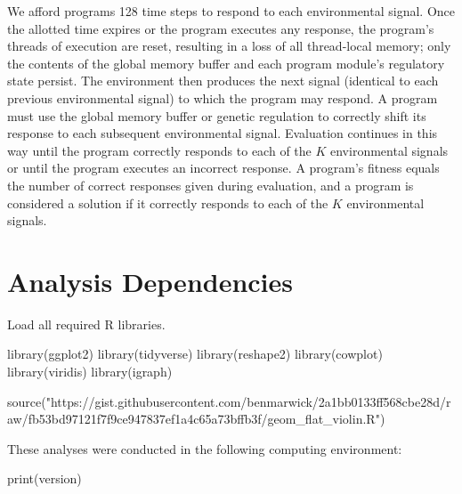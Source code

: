 \documentclass[
]{book}
\newenvironment{Shaded}{\begin{snugshade}}{\end{snugshade}}
\newcommand{\FunctionTok}[1]{\textcolor[rgb]{0.00,0.00,0.00}{#1}}
\newcommand{\NormalTok}[1]{#1}
\newcommand{\StringTok}[1]{\textcolor[rgb]{0.31,0.60,0.02}{#1}}
\begin{document}
We afford programs 128 time steps to respond to each environmental signal.
Once the allotted time expires or the program executes any response, the program's threads of execution are reset, resulting in a loss of all thread-local memory; only the contents of the global memory buffer and each program module's regulatory state persist.
The environment then produces the next signal (identical to each previous environmental signal) to which the program may respond.
A program must use the global memory buffer or genetic regulation to correctly shift its response to each subsequent environmental signal.
Evaluation continues in this way until the program correctly responds to each of the \(K\) environmental signals or until the program executes an incorrect response.
A program's fitness equals the number of correct responses given during evaluation, and a program is considered a solution if it correctly responds to each of the \(K\) environmental signals.

\hypertarget{analysis-dependencies-1}{%
\section{Analysis Dependencies}\label{analysis-dependencies-1}}

Load all required R libraries.

\begin{Shaded}
\begin{Highlighting}[]
\FunctionTok{library}\NormalTok{(ggplot2)}
\FunctionTok{library}\NormalTok{(tidyverse)}
\FunctionTok{library}\NormalTok{(reshape2)}
\FunctionTok{library}\NormalTok{(cowplot)}
\FunctionTok{library}\NormalTok{(viridis)}
\FunctionTok{library}\NormalTok{(igraph)}

\FunctionTok{source}\NormalTok{(}\StringTok{"https://gist.githubusercontent.com/benmarwick/2a1bb0133ff568cbe28d/raw/fb53bd97121f7f9ce947837ef1a4c65a73bffb3f/geom\_flat\_violin.R"}\NormalTok{)}
\end{Highlighting}
\end{Shaded}

These analyses were conducted in the following computing environment:

\begin{Shaded}
\begin{Highlighting}[]
\FunctionTok{print}\NormalTok{(version)}
\end{Highlighting}
\end{Shaded}
\end{document}
